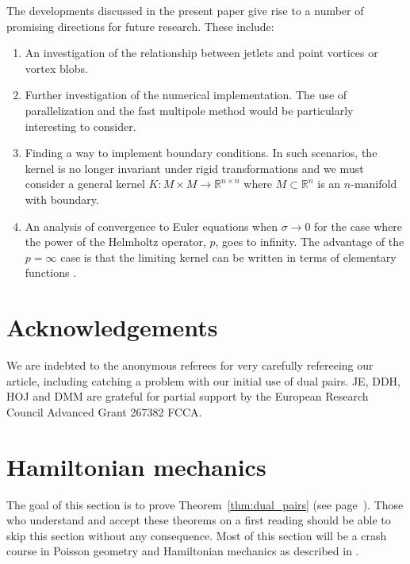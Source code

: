 \documentclass[12pt]{amsart}
\begin{document}
The developments discussed in the present paper give rise to a number of promising directions for future research. These include:
\begin{enumerate}
	\item An investigation of the relationship between jetlets and point vortices or vortex blobs.
	\item Further investigation of the numerical implementation.
		The use of parallelization and the fast multipole method would be particularly interesting to consider.
	\item Finding a way to implement boundary conditions.
		In such scenarios, the kernel is no longer invariant under rigid transformations
		and we must consider a general kernel $K:M \times M \to \mathbb{R}^{n \times n}$
		where $M \subset \mathbb{R}^n$ is an $n$-manifold with boundary.
        \item An analysis of convergence to Euler equations when $\sigma \to 0$ for the case where the power of the Helmholtz operator, $p$, goes to infinity.  The advantage of the $p=\infty$ case is that the limiting kernel can be written in terms of elementary functions \cite{MicheliGlaunes2014}.
\end{enumerate}

\section{Acknowledgements}
We are indebted to the anonymous referees for very carefully refereeing our article, including catching a problem with our initial use of dual pairs.
JE, DDH, HOJ and DMM are grateful for partial support by the European Research Council Advanced Grant 267382 FCCA.

\appendix

\section{Hamiltonian mechanics}
\label{sec:Hamiltonian}
The goal of this section is to prove Theorem~\ref{thm:dual_pairs} (see page~\pageref{thm:dual_pairs}).
Those who understand and accept these theorems on a first reading
should be able to skip this section without any consequence.
Most of this section will be a crash course in Poisson geometry
and Hamiltonian mechanics as described in \cite{FOM,MandS,Weinstein1983}.
\end{document}
